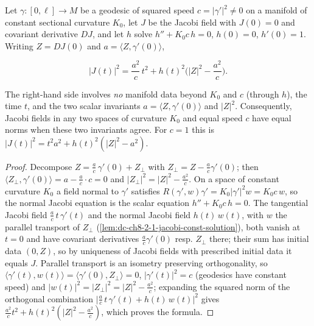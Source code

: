 \begin{lemma}
  \label{lem:dc-ch8-2-1-jacobi-norm-transfer}


  Let $\gamma:[0,\ell]\to M$ be a geodesic of squared speed $c=|\gamma'|^2\neq0$ on a
  manifold of constant sectional curvature $K_0$, let $J$ be the Jacobi field with $J(0)=0$
  and covariant derivative $DJ$, and let $h$ solve $h''+K_0c\,h=0$, $h(0)=0$, $h'(0)=1$.
  Writing $Z=DJ(0)$ and $a=\langle Z,\gamma'(0)\rangle$,

  $$
  |J(t)|^2 = \frac{a^2}{c}\,t^2 + h(t)^2\Big(|Z|^2-\frac{a^2}{c}\Big).
  $$

  The right-hand side involves \emph{no} manifold data beyond $K_0$ and $c$ (through $h$),
  the time $t$, and the two scalar invariants $a=\langle Z,\gamma'(0)\rangle$ and $|Z|^2$.
  Consequently, Jacobi fields in any two spaces of curvature $K_0$ and equal speed $c$
  have equal norms when these two invariants agree. For $c=1$ this is
  $|J(t)|^2=t^2a^2+h(t)^2(|Z|^2-a^2)$.
\end{lemma}
\begin{proof}

\sketch
  Decompose $Z=\frac{a}{c}\,\gamma'(0)+Z_\perp$ with $Z_\perp=Z-\frac{a}{c}\gamma'(0)$; then
  $\langle Z_\perp,\gamma'(0)\rangle=a-\frac{a}{c}\cdot c=0$ and
  $|Z_\perp|^2=|Z|^2-\frac{a^2}{c}$. On a space of constant curvature $K_0$ a field normal to
  $\gamma'$ satisfies $R(\gamma',w)\gamma'=K_0|\gamma'|^2w=K_0c\,w$, so the normal Jacobi
  equation is the scalar equation $h''+K_0c\,h=0$. The tangential Jacobi field
  $\frac{a}{c}\,t\,\gamma'(t)$ and the normal Jacobi field
  $h(t)\,w(t)$, with $w$ the parallel transport of $Z_\perp$
  (\cref{lem:dc-ch8-2-1-jacobi-const-solution}), both vanish at $t=0$ and have covariant
  derivatives $\frac{a}{c}\gamma'(0)$ resp. $Z_\perp$ there; their sum has initial data
  $(0,Z)$, so by uniqueness of Jacobi fields with prescribed initial data it equals $J$.
  Parallel transport is an isometry preserving orthogonality, so
  $\langle\gamma'(t),w(t)\rangle=\langle\gamma'(0),Z_\perp\rangle=0$, $|\gamma'(t)|^2=c$
  (geodesics have constant speed) and $|w(t)|^2=|Z_\perp|^2=|Z|^2-\frac{a^2}{c}$; expanding
  the squared norm of the orthogonal combination
  $\big|\frac{a}{c}\,t\,\gamma'(t)+h(t)\,w(t)\big|^2$ gives
  $\frac{a^2}{c}t^2+h(t)^2(|Z|^2-\frac{a^2}{c})$, which proves the formula.
\end{proof}

